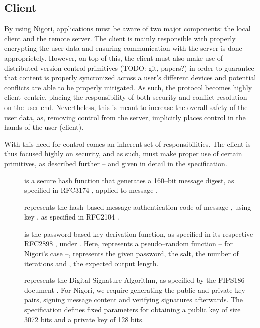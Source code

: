 \subsection{Client}
By using Nigori, applications must be aware of two major components: the local client and the remote server.
The client is mainly responsible with properly encrypting the user data and ensuring communication with the server is done approprietely.
However, on top of this, the client must also make use of distributed version control primitives (TODO: git, papers?) in order to guarantee that content is properly syncronized across a user's different devices and potential conflicts are able to be properly mitigated.
As such, the protocol becomes highly client--centric, placing the responsibility of both security and conflict resolution on the user end.
Nevertheless, this is meant to increase the overall safety of the user data, as, removing control from the server, implicitly places control in the hands of the user (client).

With this need for control comes an inherent set of responsibilities.
The client is thus focused highly on security, and as such, must make proper use of certain primitives, as described further -- and given in detail in the specification.
\begin{description}
  \item[] is a secure hash function that generates a 160--bit message digest, as specified in RFC3174 \cite{RFC3174}, applied to message .
  \item[] represents the hash--based message authentication code of message , using key , as specified in RFC2104 \cite{RFC2104}.
  \item[] is the password based key derivation function, as specified in its respective RFC2898 \cite{RFC2898}, under .
  Here,  represents a pseudo--random function --  for Nigori's case --,  represents the given password,  the salt,  the number of iterations and , the expected output length.
  \item[] represents the Digital Signature Algorithm, as specified by the FIPS186 document \cite{DSA}.
  For Nigori, we require generating the public and private key pairs, signing message content and verifying signatures afterwards.
  The specification defines fixed parameters for obtaining a public key of size 3072 bits and a private key of 128 bits.
\end{description}


